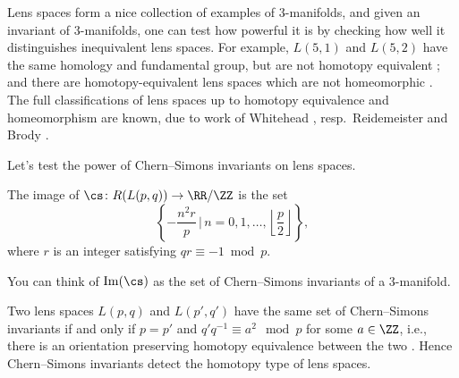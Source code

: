 Lens spaces form a nice collection of examples of $3$-manifolds, and given an invariant of $3$-manifolds, one can
test how powerful it is by checking how well it distinguishes inequivalent lens spaces. For example, $L(5, 1)$ and
$L(5, 2)$ have the same homology and fundamental group, but are not homotopy equivalent \cite{Ale19}; and there are
homotopy-equivalent lens spaces which are not homeomorphic \cites{Rei35}[\S 5]{Whi41}{Bro60}. The full
classifications of lens spaces up to homotopy equivalence and homeomorphism are known, due to work of
Whitehead \cite[\S 5]{Whi41}, resp.\ Reidemeister \cite{Rei35} and Brody \cite{Bro60}.

Let's test the power of Chern--Simons invariants on lens spaces.
\begin{thm}[{\cite[Theorem 5.1]{KK}}]\label{theorem:kk}
  The image of $\cs\colon R(L(p, q))\to\RR/\ZZ$ is the set
  \[\left\{-\frac{n^2r}{p} \,\bigg|\, n=0,1,\ldots,\left\lfloor \frac{p}{2}\right\rfloor \right\}\comma\]
  where $r$ is an integer satisfying $qr\equiv -1\bmod p$.
\end{thm}

You can think of $\mathrm{Im}(\cs)$ as the set of Chern--Simons invariants of a $3$-manifold.

\begin{remark}  
  Two lens spaces $L(p,q)$ and $L(p',q')$ have the same set of Chern--Simons invariants if and only if $p=p'$ and
  $q'q^{-1}\equiv a^2 \mod p$ for some $a\in\ZZ$, i.e., there is an orientation preserving homotopy equivalence
  between the two \cite[\S 5]{Whi41}. Hence Chern--Simons invariants detect the homotopy type of lens spaces.
\end{remark}

